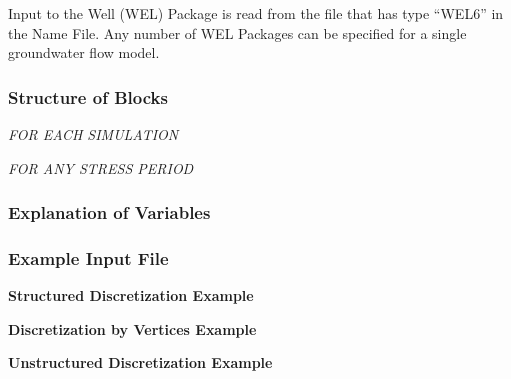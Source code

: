 Input to the Well (WEL) Package is read from the file that has type ``WEL6'' in the Name File.  Any number of WEL Packages can be specified for a single groundwater flow model.

\vspace{5mm}
\subsubsection{Structure of Blocks}
\vspace{5mm}

\noindent \textit{FOR EACH SIMULATION}


\vspace{5mm}
\noindent \textit{FOR ANY STRESS PERIOD}

\packageperioddescription

\vspace{5mm}
\subsubsection{Explanation of Variables}
\begin{description}

\end{description}

\vspace{5mm}
\subsubsection{Example Input File}


\noindent \textbf{Structured Discretization Example}


\noindent \textbf{Discretization by Vertices Example}


\noindent \textbf{Unstructured Discretization Example}


\vspace{5mm}
